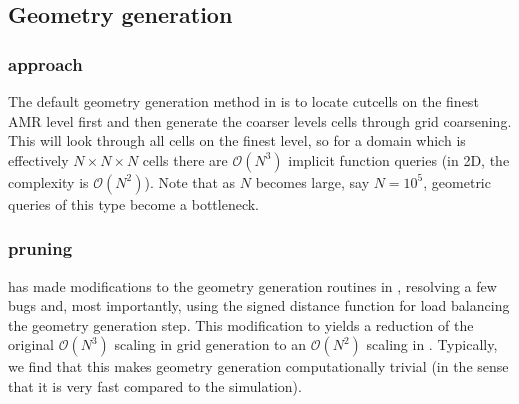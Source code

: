 \documentclass[letterpaper,10pt,english]{sphinxmanual}
\begin{document}
\subsection{Geometry generation}
\label{\detokenize{Source/SpatialDiscretization:geometry-generation}}\label{\detokenize{Source/SpatialDiscretization:chap-geometrygeneration}}

\subsubsection{ approach}
\label{\detokenize{Source/SpatialDiscretization:chombo-approach}}
The default geometry generation method in  is to locate cut\sphinxhyphen{}cells on the finest AMR level first and then generate the coarser levels cells through grid coarsening.
This will look through all cells on the finest level, so for a domain which is effectively \(N\times N\times N\) cells there are \(\mathcal{O}\left(N^3\right)\) implicit function queries (in 2D, the complexity is \(\mathcal{O}\left(N^2\right)\)).
Note that as \(N\) becomes large, say \(N=10^5\), geometric queries of this type become a bottleneck.


\subsubsection{ pruning}
\label{\detokenize{Source/SpatialDiscretization:chombo-discharge-pruning}}
 has made modifications to the geometry generation routines in , resolving a few bugs and, most importantly, using the signed distance function for load balancing the geometry generation step.
This modification to  yields a reduction of the original \(\mathcal{O}\left(N^3\right)\) scaling in  grid generation to an \(\mathcal{O}\left(N^2\right)\) scaling in .
Typically, we find that this makes geometry generation computationally trivial (in the sense that it is very fast compared to the simulation).
\end{document}
